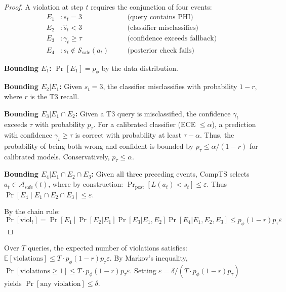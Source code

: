\begin{proof}
A violation at step $t$ requires the conjunction of four events:
\begin{align}
E_1 &: s_t = 3 \quad &&\text{(query contains PHI)} \\
E_2 &: \hat{s}_t < 3 \quad &&\text{(classifier misclassifies)} \\
E_3 &: \gamma_t \geq \tau \quad &&\text{(confidence exceeds fallback)} \\
E_4 &: s_t \notin \mathcal{S}_{\text{safe}}(a_t) \quad &&\text{(posterior check fails)}
\end{align}

\textbf{Bounding $E_1$:} $\Pr[E_1] = p_\phi$ by the data distribution.

\textbf{Bounding $E_2 | E_1$:} Given $s_t = 3$, the classifier 
misclassifies with probability $1 - r$, where $r$ is the T3 recall.

\textbf{Bounding $E_3 | E_1 \cap E_2$:} Given a T3 query is 
misclassified, the confidence $\gamma_t$ exceeds $\tau$ with 
probability $p_\tau$. For a calibrated classifier (ECE $\leq \alpha$), 
a prediction with confidence $\gamma_t \geq \tau$ is correct with 
probability at least $\tau - \alpha$. Thus, the probability of being 
both wrong and confident is bounded by $p_\tau \leq \alpha / (1-r)$ 
for calibrated models. Conservatively, $p_\tau \leq \alpha$.

\textbf{Bounding $E_4 | E_1 \cap E_2 \cap E_3$:} Given all three 
preceding events, CompTS selects $a_t \in \mathcal{A}_{\text{safe}}(t)$, 
where by construction:
$\Pr_{\text{post}}[L(a_t) < s_t] \leq \varepsilon$. Thus 
$\Pr[E_4 \mid E_1 \cap E_2 \cap E_3] \leq \varepsilon$.

By the chain rule:
\begin{equation}
\Pr[\text{viol}_t] = \Pr[E_1]\Pr[E_2|E_1]\Pr[E_3|E_1,E_2]\Pr[E_4|E_1,E_2,E_3]
\leq p_\phi (1-r) p_\tau \varepsilon
\end{equation}
\end{proof}

\begin{corollary}
Over $T$ queries, the expected number of violations satisfies:
$\mathbb{E}[\text{violations}] \leq T \cdot p_\phi (1-r) p_\tau \varepsilon$.
By Markov's inequality, $\Pr[\text{violations} \geq 1] \leq T \cdot p_\phi(1-r)p_\tau\varepsilon$.
Setting $\varepsilon = \delta / (T \cdot p_\phi(1-r)p_\tau)$ yields 
$\Pr[\text{any violation}] \leq \delta$.
\end{corollary}


